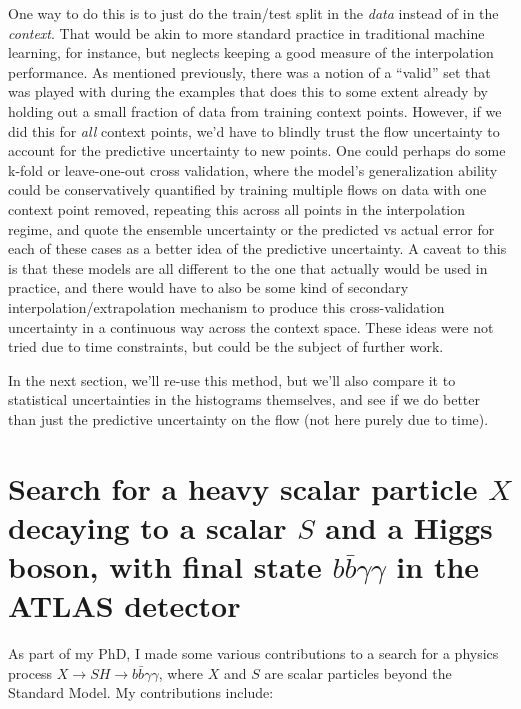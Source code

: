 \documentclass[
  11pt,
  numbers=noendperiod]{book}
\begin{document}
One way to do this is to just do the train/test split in the \emph{data}
instead of in the \emph{context}. That would be akin to more standard
practice in traditional machine learning, for instance, but neglects
keeping a good measure of the interpolation performance. As mentioned
previously, there was a notion of a ``valid'' set that was played with
during the examples that does this to some extent already by holding out
a small fraction of data from training context points. However, if we
did this for \emph{all} context points, we'd have to blindly trust the
flow uncertainty to account for the predictive uncertainty to new
points. One could perhaps do some k-fold or leave-one-out cross
validation, where the model's generalization ability could be
conservatively quantified by training multiple flows on data with one
context point removed, repeating this across all points in the
interpolation regime, and quote the ensemble uncertainty or the
predicted vs actual error for each of these cases as a better idea of
the predictive uncertainty. A caveat to this is that these models are
all different to the one that actually would be used in practice, and
there would have to also be some kind of secondary
interpolation/extrapolation mechanism to produce this cross-validation
uncertainty in a continuous way across the context space. These ideas
were not tried due to time constraints, but could be the subject of
further work.

In the next section, we'll re-use this method, but we'll also compare it
to statistical uncertainties in the histograms themselves, and see if we
do better than just the predictive uncertainty on the flow (not here
purely due to time).

\hypertarget{sec-anal}{%
\chapter{\texorpdfstring{Search for a heavy scalar particle \(X\)
decaying to a scalar \(S\) and a Higgs boson, with final state
\(b\bar{b}\gamma\gamma\) in the ATLAS
detector}{Search for a heavy scalar particle X decaying to a scalar S and a Higgs boson, with final state b\textbackslash bar\{b\}\textbackslash gamma\textbackslash gamma in the ATLAS detector}}\label{sec-anal}}

As part of my PhD, I made some various contributions to a search for a
physics process \(X\rightarrow SH \rightarrow b\bar{b}\gamma\gamma\),
where \(X\) and \(S\) are scalar particles beyond the Standard Model. My
contributions include:
\end{document}
